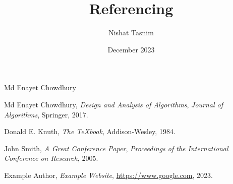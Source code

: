 \documentclass{article}
\title{Referencing}
\author{Nishat Tasnim}
\date{December 2023}
\begin{document}
Md Enayet Chowdhury \cite{chowdhury2017design}

\begin{thebibliography}{9}
    Md Enayet Chowdhury, \emph{Design and Analysis of Algorithms}, \textit{Journal of Algorithms}, Springer, 2017.

    Donald E. Knuth, \emph{The \TeX book}, Addison-Wesley, 1984.

    John Smith, \emph{A Great Conference Paper}, \textit{Proceedings of the International Conference on Research}, 2005.

    Example Author, \emph{Example Website}, \url{https://www.google.com}, 2023.
\end{thebibliography}



\end{document}
